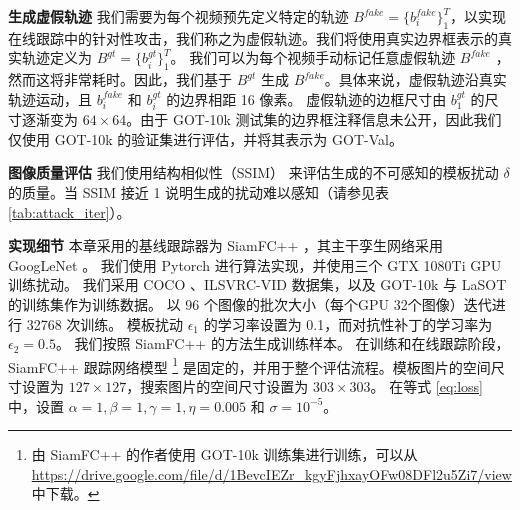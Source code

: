 \textbf{生成虚假轨迹} 我们需要为每个视频预先定义特定的轨迹 $B^{fake}=\{b^{fake}_i\}_1^{T}$，以实现在线跟踪中的针对性攻击，我们称之为虚假轨迹。我们将使用真实边界框表示的真实轨迹定义为 $B^{gt}=\{b^{gt}_i\}_1^T$。
我们可以为每个视频手动标记任意虚假轨迹 $B^{fake}$ ，然而这将非常耗时。因此，我们基于 $B^{gt}$ 生成 $B^{fake}$。具体来说，虚假轨迹沿真实轨迹运动，且 $b^{fake}_i$ 和 $b^{gt}_i$ 的边界相距 16 像素。
虚假轨迹的边框尺寸由 $b^{gt}_1$ 的尺寸逐渐变为 $64\times 64$。由于 GOT-10k 测试集的边界框注释信息未公开，因此我们仅使用 GOT-10k 的验证集进行评估，并将其表示为 GOT-Val。

\textbf{图像质量评估} 我们使用结构相似性（SSIM）\cite{SSIM} 来评估生成的不可感知的模板扰动 $\delta$ 的质量。当 SSIM 接近 1 说明生成的扰动难以感知（请参见表 \ref{tab:attack_iter}）。

\textbf{实现细节} 本章采用的基线跟踪器为 SiamFC++ \cite{SiamFC++}，其主干孪生网络采用 GoogLeNet \cite{GoogLeNet}。
我们使用 Pytorch 进行算法实现，并使用三个 GTX 1080Ti GPU 训练扰动。
我们采用 COCO \cite{COCO}、ILSVRC-VID \cite{VID} 数据集，以及 GOT-10k \cite{GOT-10k} 与 LaSOT \cite{LaSOT} 的训练集作为训练数据。
以 96 个图像的批次大小（每个GPU 32个图像）迭代进行 32768 次训练。
模板扰动 $\epsilon_1$ 的学习率设置为 0.1，而对抗性补丁的学习率为 $\epsilon_2 = 0.5$。
我们按照 SiamFC++ 的方法生成训练样本。
在训练和在线跟踪阶段，SiamFC++ 跟踪网络模型 \footnote{由 SiamFC++ 的作者使用 GOT-10k 训练集进行训练，可以从 \url{https://drive.google.com/file/d/1BevcIEZr_kgyFjhxayOFw08DFl2u5Zi7/view} 中下载。} 是固定的，并用于整个评估流程。模板图片的空间尺寸设置为 $127\times 127$，搜索图片的空间尺寸设置为 $303\times 303$。
在等式 \ref{eq:loss} 中，设置 $\alpha=1, \beta=1, \gamma=1, \eta=0.005$ 和 $\sigma=10^{-5}$。

